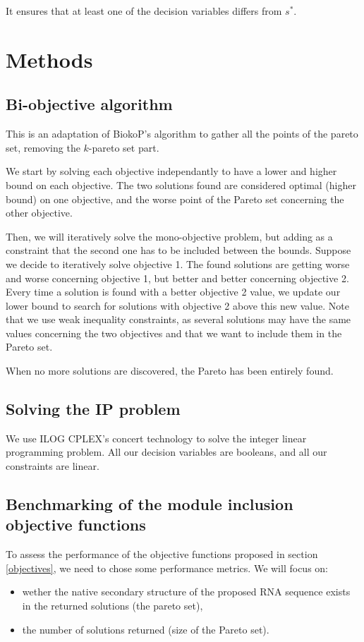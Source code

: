 \documentclass{article}
\begin{document}
It ensures that at least one of the decision variables differs from $s^*$.

\section{Methods \label{methods}}
\subsection{Bi-objective algorithm}
This is an adaptation of BiokoP's algorithm \cite{legendre_bi-objective_2018} to gather all the points of the pareto set, removing the $k$-pareto set part.

We start by solving each objective independantly to have a lower and higher bound on each objective. 
The two solutions found are considered optimal (higher bound) on one objective, and the worse point of the Pareto set concerning the other objective.

Then, we will iteratively solve the mono-objective problem, but adding as a constraint that the second one has to be included between the bounds.
Suppose we decide to iteratively solve objective 1. 
The found solutions are getting worse and worse concerning objective 1, but better and better concerning objective 2. 
Every time a solution is found with a better objective 2 value, we update our lower bound to search for solutions with objective 2 above this new value.
Note that we use weak inequality constraints, as several solutions may have the same values concerning the two objectives and that we want to include them in the Pareto set.

When no more solutions are discovered, the Pareto has been entirely found.

\subsection{Solving the IP problem}
We use ILOG CPLEX's \cite{cplex} concert technology to solve the integer linear programming problem. All our decision variables are booleans, and all our constraints are linear.

\subsection{Benchmarking of the module inclusion objective functions}
To assess the performance of the objective functions proposed in section \ref{objectives}, we need to chose some performance metrics.
We will focus on:
\begin{itemize}
	\item wether the native secondary structure of the proposed RNA sequence exists in the returned solutions (the pareto set),
	\item the number of solutions returned (size of the Pareto set).
\end{itemize}
\end{document}
